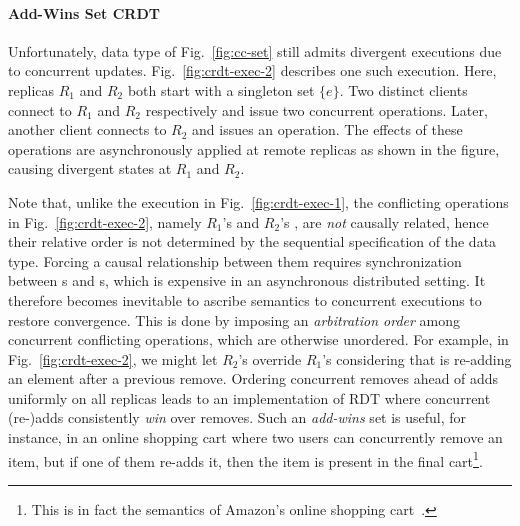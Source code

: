 \noindent\paragraph{Add-Wins Set CRDT} Unfortunately, 
data type of Fig.~\ref{fig:cc-set} still admits divergent executions
due to concurrent updates.  Fig.~\ref{fig:crdt-exec-2} describes one
such execution. Here, replicas $R_1$ and $R_2$ both start with a
singleton set $\{e\}$.  Two distinct clients connect to $R_1$ and
$R_2$ respectively and issue two concurrent 
operations. Later, another client connects to $R_2$ and issues an
 operation. The effects of these operations are
asynchronously applied at remote replicas as shown in the figure,
causing divergent states at $R_1$ and $R_2$.

Note that, unlike the execution in Fig.~\ref{fig:crdt-exec-1}, the
conflicting operations in Fig.~\ref{fig:crdt-exec-2}, namely $R_1$'s
 and $R_2$'s , are \emph{not} causally related,
hence their relative order is not determined by the sequential
specification of the data type. Forcing a causal relationship between
them requires synchronization between s and s,
which is expensive in an asynchronous distributed setting. It
therefore becomes inevitable to ascribe semantics to concurrent
executions to restore convergence. This is done by imposing an
\emph{arbitration order} among concurrent conflicting operations,
which are otherwise unordered. For example, in
Fig.~\ref{fig:crdt-exec-2}, we might let $R_2$'s  override
$R_1$'s  considering that  is re-adding an
element after a previous remove. Ordering concurrent removes ahead
of adds uniformly on all replicas leads to an implementation of
 RDT where concurrent (re-)adds consistently \emph{win}
over removes. Such an \emph{add-wins} set is useful, for instance, in
an online shopping cart where two users can concurrently
remove an item, but if one of them re-adds it, then the
item is present in the final cart\footnote{This is in fact the
semantics of Amazon's online shopping cart~\cite{dynamo}.}.

